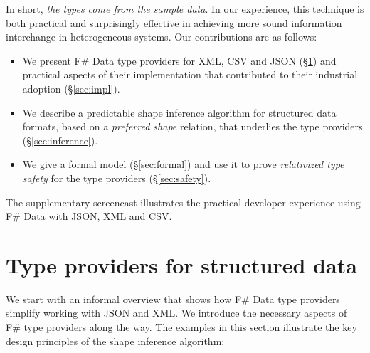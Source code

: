 \documentclass[10pt,preprint,blind,clearpagebib]{sigplanconf}
\begin{document}
In short, \emph{the types come from the sample data}. In our experience, this technique is 
both practical and surprisingly effective in achieving more sound information interchange 
in heterogeneous systems. Our contributions are as follows:

\begin{itemize}
\item We present F\# Data type providers for XML, CSV and JSON (\S\ref{sec:providers}) 
  and practical aspects of their implementation that contributed to their industrial 
  adoption (\S\ref{sec:impl}). 

\item We describe a predictable shape inference algorithm for structured data formats, 
  based on a \emph{preferred shape} relation, that underlies the type providers 
  (\S\ref{sec:inference}).

\item We give a formal model (\S\ref{sec:formal}) and use it to prove
  \emph{relativized type safety} for the type providers (\S\ref{sec:safety}).
\end{itemize}

\vspace{-0.1em}
\noindent
The supplementary screencast illustrates the practical developer experience using 
  F\# Data with JSON, XML and CSV.


%
%

\section{Type providers for structured data}
\label{sec:providers}

We start with an informal overview that shows how F\# Data type providers simplify working with 
JSON and XML. We introduce the necessary aspects of F\# type providers along the way. The examples 
in this section illustrate the key design principles of the shape inference algorithm:
\end{document}
